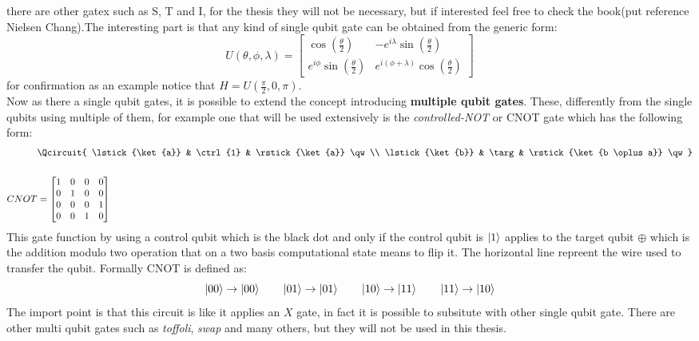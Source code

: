 there are other gatex such as S, T and I, for the thesis they will not be necessary, but if interested feel free to check the book(put reference Nielsen Chang).The interesting part is that any kind of single qubit gate can be obtained from the generic form:
\begin{equation}\label{generic gate}
	U(\theta,  \phi, \lambda) =  \begin{bmatrix}
		\cos(\frac{\theta}{2}) & -e^{i\lambda} \sin(\frac{\theta}{2})\\
		e^{i\phi}\sin(\frac{\theta}{2}) & e^{i(\phi+ \lambda)}\cos(\frac{\theta}{2})
	\end{bmatrix}
\end{equation}
for confirmation as an example notice that $H = U(\frac{\pi}{2}, 0, \pi)$.\\
Now as there a single qubit gates, it is possible to extend the concept introducing \textbf{multiple qubit gates}. These, differently from the single qubits using multiple of them, for example one that will be used extensively is the \textit{controlled-NOT} or CNOT gate which has the following form:
\begin{align*}
	& \Qcircuit{
		\lstick{\ket{a}} & \ctrl{1} & \rstick{\ket{a}} \qw \\
		\lstick{\ket{b}} & \targ & \rstick{\ket{b \oplus a}} \qw
	}\\
	& \\
	CNOT &= \begin{bmatrix}
		1 & 0 & 0 & 0 \\
		0 & 1 & 0 & 0 \\
		0 & 0 & 0 & 1 \\
		0 & 0 & 1 & 0
	\end{bmatrix}
\end{align*} 
This gate function by using a control qubit which is the black dot and only if the control qubit is $\ket{1}$ applies to the target qubit $\oplus$ which is the addition modulo two operation that on a two basis computational state means to flip it. The horizontal line repreent the wire used to transfer the qubit. Formally CNOT is defined as:
\begin{equation*}
	\ket{00} \to \ket{00} \qquad \ket{01} \to \ket{01} \qquad \ket{10} \to \ket{11} \qquad \ket{11} \to \ket{10}
\end{equation*}
The import point is that this circuit is like it applies an $X$ gate, in fact it is possible to subsitute with other single qubit gate. There are other multi qubit gates such as \textit{toffoli}, \textit{swap} and many others, but they will not be used in this thesis.

